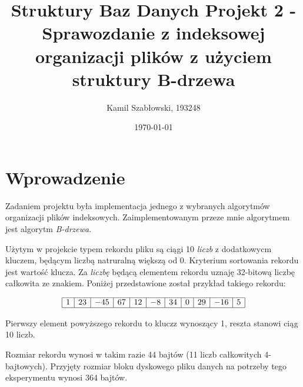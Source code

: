 \documentclass[12pt]{article}
\title{Struktury Baz Danych Projekt 2 - Sprawozdanie z indeksowej organizacji plików z użyciem struktury B-drzewa}
\author{Kamil Szabłowski, 193248}
\date{\today}
\begin{document}
\maketitle

\section{Wprowadzenie}
Zadaniem projektu była implementacja jednego z wybranych algorytmów organizacji plików indeksowych.
Zaimplementowanym przeze mnie algorytmem jest algorytm \emph{B-drzewa}.

Użytym w projekcie typem rekordu pliku są ciągi 10 \emph{liczb} z dodatkowycm kluczem, 
będącym liczbą natruralną większą od 0. Kryterium sortowania rekordu jest wartość klucza.
Za \emph{liczbę} będącą elementem rekordu uznaję 32-bitową liczbę całkowita ze znakiem. 
Poniżej przedstawione został przykład takiego rekordu:

\[
\begin{array}{|c|c|c|c|c|c|c|c|c|c|c|}
\hline
1 & 23 & -45 & 67 & 12 & -8 & 34 & 0 & 29 & -16 & 5 \\
\hline
\end{array}
\]

Pierwszy element powyższego rekordu to kluczz wynoszący 1, reszta stanowi ciąg 10 liczb.

Rozmiar rekordu wynosi w takim razie 44 bajtów (11 liczb całkowitych 4-bajtowych).
Przyjęty rozmiar bloku dyskowego pliku danych na potrzeby tego eksperymentu wynosi 364 bajtów.
\end{document}
